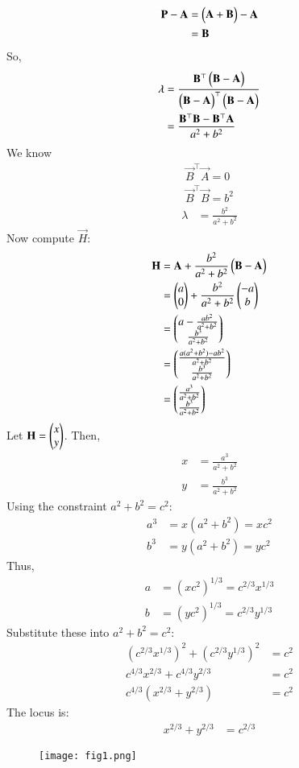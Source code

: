 \documentclass[journal]{IEEEtran}
\begin{document}
\begin{align}
\mathbf{P}-\mathbf{A} &= \begin{pmatrix}\mathbf{A}+\mathbf{B}\end{pmatrix}-\mathbf{A} \\
&= \mathbf{B}
\end{align}
So,
\begin{align}
\lambda &= \frac{\mathbf{B}^\top\begin{pmatrix}\mathbf{B}-\mathbf{A}\end{pmatrix}}{\begin{pmatrix}\mathbf{B}-\mathbf{A}\end{pmatrix}^\top\begin{pmatrix}\mathbf{B}-\mathbf{A}\end{pmatrix}} \\
&= \frac{\mathbf{B}^\top\mathbf{B}-\mathbf{B}^\top\mathbf{A}}{a^2+b^2}
\end{align}
We know
\begin{align}
\vec{B}^\top\vec{A}=0\\
\vec{B}^\top\vec{B}=b^2
\end{align}
\begin{align}
\lambda &= \frac{b^2}{a^2+b^2}
\end{align}
Now compute $\vec{H}$:
\begin{align}
\mathbf{H} &= \mathbf{A} + \frac{b^2}{a^2+b^2}\begin{pmatrix}\mathbf{B}-\mathbf{A}\end{pmatrix}\\
&= \begin{pmatrix}a\\0\end{pmatrix} + \frac{b^2}{a^2+b^2}\begin{pmatrix}-a\\b\end{pmatrix} \\
&= \begin{pmatrix}a - \frac{ab^2}{a^2+b^2} \\ \frac{b^3}{a^2+b^2}\end{pmatrix} \\
&= \begin{pmatrix}\frac{a(a^2+b^2)-ab^2}{a^2+b^2} \\ \frac{b^3}{a^2+b^2}\end{pmatrix} \\
&= \begin{pmatrix}\frac{a^3}{a^2+b^2} \\ \frac{b^3}{a^2+b^2}\end{pmatrix}
\end{align}
Let $\mathbf{H} = \begin{pmatrix}x \\ y\end{pmatrix}$. Then,
\begin{align}
x &= \frac{a^3}{a^2+b^2} \\
y &= \frac{b^3}{a^2+b^2}
\end{align}
Using the constraint $a^2+b^2=c^2$:
\begin{align}
a^3 &= x(a^2+b^2) = xc^2 \\
b^3 &= y(a^2+b^2) = yc^2
\end{align}
Thus,
\begin{align}
a &= (xc^2)^{1/3} = c^{2/3}x^{1/3} \\
b &= (yc^2)^{1/3} = c^{2/3}y^{1/3}
\end{align}
Substitute these into $a^2+b^2=c^2$:
\begin{align}
(c^{2/3}x^{1/3})^2 + (c^{2/3}y^{1/3})^2 &= c^2 \\
c^{4/3}x^{2/3} + c^{4/3}y^{2/3} &= c^2 \\
c^{4/3}(x^{2/3} + y^{2/3}) &= c^2
\end{align}
The locus is:
\begin{align}
x^{2/3} + y^{2/3} &= c^{2/3}
\end{align}
\begin{figure}[H]
\centering
\texttt{[image: fig1.png]}
\caption{}
\label{fig:1}
\end{figure}
\end{document}
